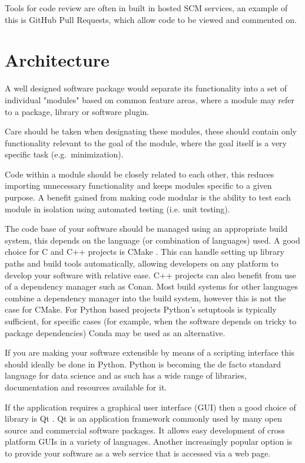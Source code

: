 \documentclass[jnr]{iosart2x}
\begin{document}
Tools for code review are often in built in hosted SCM services, an example of this is GitHub Pull Requests, which allow code to be viewed and commented on.

\section{Architecture}
\label{Architecture}

A well designed software package would separate its functionality into a set of individual "modules" based on common feature areas, where a module may refer to a package, library or software plugin.

Care should be taken when designating these modules, these should contain only functionality relevant to the goal of the module, where the goal itself is a very specific task (e.g.\ minimization).

Code within a module should be closely related to each other, this reduces importing unnecessary functionality and keeps modules specific to a given purpose.
A benefit gained from making code modular is the ability to test each module in isolation using automated testing (i.e. unit testing).

The code base of your software should be managed using an appropriate build system, this depends on the language (or combination of languages) used.
A good choice for C and C++ projects is CMake \cite{CMake}.
This can handle setting up library paths and build tools automatically, allowing developers on any platform to develop your software with relative ease.
C++ projects can also benefit from use of a dependency manager such as Conan.
Most build systems for other languages combine a dependency manager into the build system, however this is not the case for CMake.
For Python based projects Python's setuptools is typically sufficient, for specific cases (for example, when the software depends on tricky to package dependencies) Conda may be used as an alternative.

If you are making your software extensible by means of a scripting interface this should ideally be done in Python.
Python is becoming the de facto standard language for data science and as such has a wide range of libraries, documentation and resources available for it.

If the application requires a graphical user interface (GUI) then a good choice of library is Qt \cite{Qt}.
Qt is an application framework commonly used by many open source and commercial software packages.
It allows easy development of cross platform GUIs in a variety of languages.
Another increasingly popular option is to provide your software as a web service that is accessed via a web page.
\end{document}
